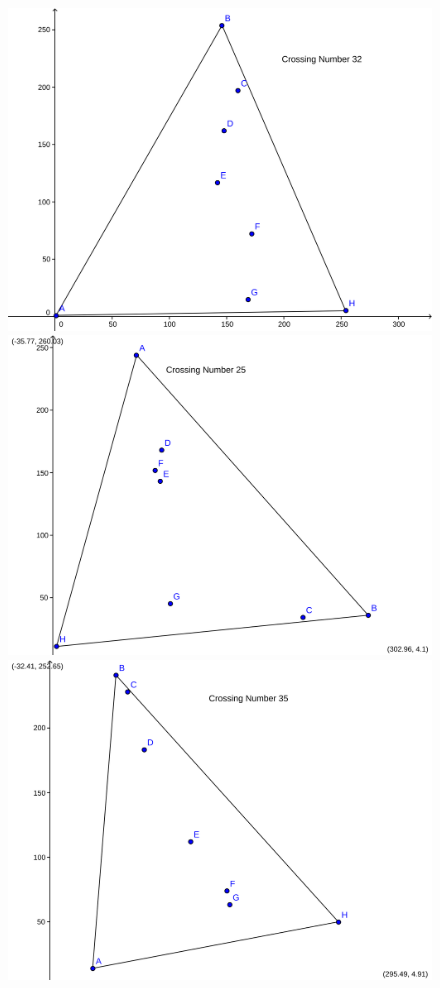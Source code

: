 \documentclass[11pt,epsf,times,letterpaper]{article}
\begin{document}
\begin{figure}
		\includegraphics[scale=.15]{png/o2554.png}
		\includegraphics[scale=.15]{png/o2737.png}
		\includegraphics[scale=.15]{png/o2785.png}

\end{figure}
\end{document}
